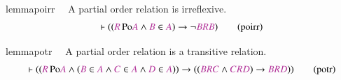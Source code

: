 \begin{restatable}{lemma}{poirr}~~ A partial order relation is irreflexive. 
~
\begin{align}
\vdash ( ( \mc{R} \,\mathrm{Po} \mc{A} \wedge \mc{B} \in \mc{A} ) \rightarrow
    \lnot \mc{B} \mc{R} \mc{B} )\label{eq:poirr}\tag{poirr}
\end{align}
\end{restatable}

\begin{restatable}{lemma}{potr}~~ A partial order relation is a transitive
relation.  ~
\begin{align}
\vdash ( ( \mc{R} \,\mathrm{Po} \mc{A} \wedge ( \mc{B} \in \mc{A} \wedge \mc{C}
    \in \mc{A} \wedge \mc{D} \in \mc{A} ) ) \rightarrow ( ( \mc{B} \mc{R}
    \mc{C} \wedge \mc{C} \mc{R} \mc{D} ) \rightarrow \mc{B} \mc{R} \mc{D} )
    )\label{eq:potr}\tag{potr}
\end{align}
\end{restatable}

\dfxp

\dfrel

\dfcnv

